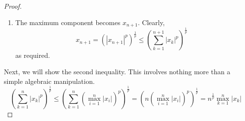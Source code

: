 \documentclass[letterpaper,11pt]{article}
\newcommand{\inv}[1]{\frac{1}{#1}}
\begin{document}
\begin{enumerate}
\begin{proof}
\begin{enumerate}
                \item The maximum component becomes $x_{n+1}$. Clearly,
                    \begin{equation*}
                        x_{n+1} = \left(|x_{n+1}|^p\right)^\inv{p}
                        \leq \left(\sum_{k=1}^{n+1} |x_k|^p\right)^\inv{p}
                    \end{equation*}
                    as required.
            \end{enumerate}

            Next, we will show the second inequality. This involves nothing
            more than a simple algebraic manipulation.
            \begin{equation*}
                \left(\sum_{k=1}^n |x_k|^p\right)^\inv{p}
                \leq
                \left(
                    \sum_{k=1}^n \left(\max_{i=1}^n |x_i|\right)^p
                \right)^\inv{p}
                = \left(n \left(\max_{i=1}^n |x_i|\right)^p\right)^\inv{p}
                = n^\inv{p} \max_{k=1}^n |x_k|
            \end{equation*}
        \end{proof}
\end{enumerate}
\end{document}
